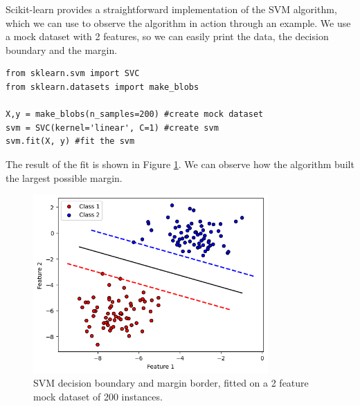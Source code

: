 \documentclass[12pt]{article}
\begin{document}
Scikit-learn \cite{pedregosa2011} provides a straightforward implementation of the SVM algorithm, which we can use to observe the algorithm in action through an example. We use a mock dataset with 2 features, so we can easily print the data, the decision boundary and the margin. 


\begin{lstlisting}
from sklearn.svm import SVC
from sklearn.datasets import make_blobs 

X,y = make_blobs(n_samples=200) #create mock dataset
svm = SVC(kernel='linear', C=1) #create svm
svm.fit(X, y) #fit the svm
\end{lstlisting}

The result of the fit is shown in Figure \ref{fig:classical svm mock}. We can observe how the algorithm built the largest possible margin. 

\begin{figure}[h!]
    \centering
    \includegraphics[width=0.8\textwidth]{images/classicalsvm.png}
    \caption{SVM decision boundary and margin border, fitted on a 2 feature mock dataset of 200 instances.}
    \label{fig:classical svm mock}
\end{figure}
\end{document}
